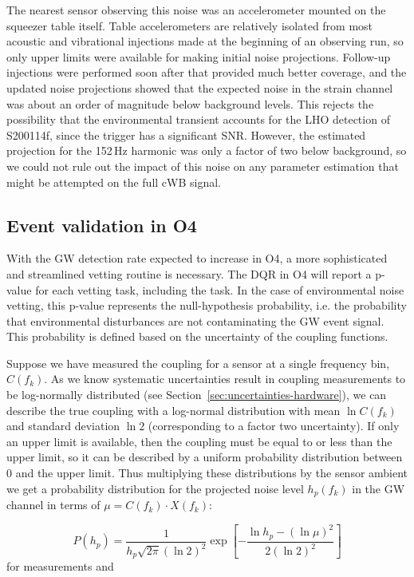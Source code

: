 The nearest sensor observing this noise was an accelerometer mounted on the squeezer table itself.
Table accelerometers are relatively isolated from most acoustic and vibrational injections made at the beginning of an observing run, so only upper limits were available for making initial noise projections.
Follow-up injections were performed soon after that provided much better coverage, and the updated noise projections showed that the expected noise in the strain channel was about an order of magnitude below background levels.
This rejects the possibility that the environmental transient accounts for the LHO detection of S200114f, since the trigger has a significant SNR.
However, the estimated projection for the 152\,Hz harmonic was only a factor of two below background, so we could not rule out the impact of this noise on any parameter estimation that might be attempted on the full \ac{cWB} signal.


\subsection{Event validation in O4}

With the \ac{GW} detection rate expected to increase in \ac{O4}, a more sophisticated and streamlined vetting routine is necessary.
The \ac{DQR} in \ac{O4} will report a p-value for each vetting task, including the  task.
In the case of environmental noise vetting, this p-value represents the null-hypothesis probability, i.e. the probability that environmental disturbances are not contaminating the \ac{GW} event signal.
This probability is defined based on the uncertainty of the coupling functions.

Suppose we have measured the coupling for a sensor at a single frequency bin, $C(f_k)$.
As we know systematic uncertainties result in coupling measurements to be log-normally distributed (see Section~\ref{sec:uncertainties-hardware}), we can describe the true coupling with a log-normal distribution with mean $\ln C(f_k)$ and standard deviation $\ln 2$ (corresponding to a factor two uncertainty).
If only an upper limit is available, then the coupling must be equal to or less than the upper limit, so it can be described by a uniform probability distribution between 0 and the upper limit.
Thus multiplying these distributions by the sensor ambient we get a probability distribution for the projected noise level $h_p(f_k)$ in the \ac{GW} channel in terms of $\mu = C(f_k) \cdot X(f_k)$:

\begin{equation}
	P(h_p) = \frac{1}{h_p \sqrt{2\pi} (\ln 2)^2} \exp \left[ -\frac{\ln h_p - (\ln \mu)^2}{2 (\ln 2)^2} \right]
\end{equation}
for measurements and

